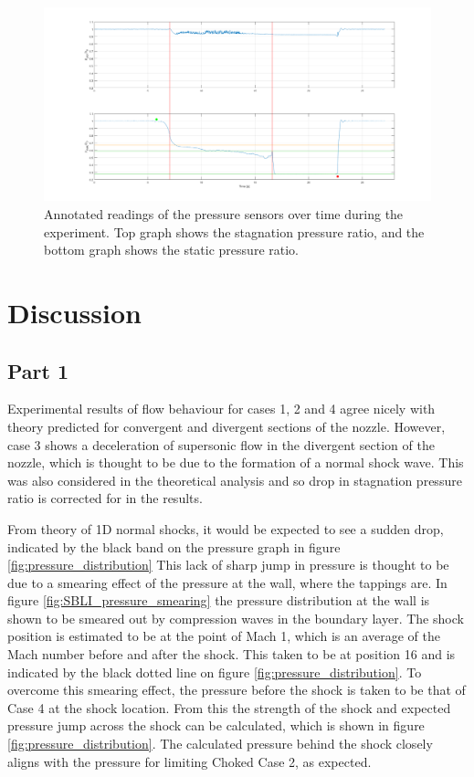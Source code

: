 \documentclass{article}
\begin{document}
\begin{figure}[H]
    \centering
    \includegraphics[width=1\textwidth]{../Supersonic_Nozzle/tunnel_pressures_annotated.png}
    \caption{Annotated readings of the pressure sensors over time during the experiment. Top graph shows the stagnation pressure ratio, and the bottom graph shows the static pressure ratio.}
    \label{fig:figure8}
\end{figure}

\section{Discussion}

\subsection{Part 1}

Experimental results of flow behaviour for cases 1, 2 and 4 agree nicely with theory predicted for convergent and divergent sections of the nozzle.
However, case 3 shows a deceleration of supersonic flow in the divergent section of the nozzle, which is thought to be due to the formation of a normal shock wave.
This was also considered in the theoretical analysis and so drop in stagnation pressure ratio is corrected for in the results.

From theory of 1D normal shocks, it would be expected to see a sudden drop, indicated by the black band on the pressure graph in figure \ref{fig:pressure_distribution}
This lack of sharp jump in pressure is thought to be due to a smearing effect of the pressure at the wall, where the tappings are.
In figure \ref{fig:SBLI_pressure_smearing} the pressure distribution at the wall is shown to be smeared out by compression waves in the boundary layer.
The shock position is estimated to be at the point of Mach 1, which is an average of the Mach number before and after the shock.
This taken to be at position 16 and is indicated by the black dotted line on figure \ref{fig:pressure_distribution}.
To overcome this smearing effect, the pressure before the shock is taken to be that of Case 4 at the shock location.
From this the strength of the shock and expected pressure jump across the shock can be calculated, which is shown in figure \ref{fig:pressure_distribution}.
The calculated pressure behind the shock closely aligns with the pressure for limiting Choked Case 2, as expected.
\end{document}

